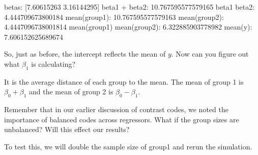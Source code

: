 \documentclass[letterpaper,10pt,english]{sphinxmanual}
\begin{document}
\begin{sphinxVerbatim}[commandchars=\\\{\}]
betas: [7.60615263 3.16144295]
beta1 + beta2: 10.767595577579165
beta1 \PYGZhy{} beta2: 4.444709673800184
mean(group1): 10.767595577579163
mean(group2): 4.4447096738001814
mean(group1) \PYGZhy{} mean(group2): 6.322885903778982
mean(y): 7.606152625689674
\end{sphinxVerbatim}

\noindent{}

So, just as before, the intercept reflects the mean of \(y\). Now can you figure out what \(\beta_1\) is calculating?

It is the average distance of each group to the mean. The mean of group 1 is \(\beta_0 + \beta_1\) and the mean of group 2 is \(\beta_0 - \beta_1\).

Remember that in our earlier discussion of contrast codes, we noted the importance of balanced codes across regressors. What if the group sizes are unbalanced?  Will this effect our results?

To test this, we will double the sample size of group1 and rerun the simulation.
\end{document}
